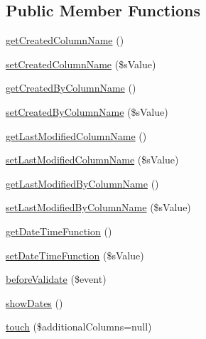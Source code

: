 \subsection*{Public Member Functions}
\begin{DoxyCompactItemize}
\item 
\hyperlink{classCXLTimeStampBehavior_af4acef2afbd2be93afee6dcc132b5634}{getCreatedColumnName} ()
\item 
\hyperlink{classCXLTimeStampBehavior_aefa0bd89eae6e37ce37bca6738781c61}{setCreatedColumnName} (\$sValue)
\item 
\hyperlink{classCXLTimeStampBehavior_a14d422fab23670511b207155a0657557}{getCreatedByColumnName} ()
\item 
\hyperlink{classCXLTimeStampBehavior_af3cf22407098fb8c99099ace3f51fa16}{setCreatedByColumnName} (\$sValue)
\item 
\hyperlink{classCXLTimeStampBehavior_a0905d98612ed716b9368a0e0ac5e5aeb}{getLastModifiedColumnName} ()
\item 
\hyperlink{classCXLTimeStampBehavior_aa43f21092ab8266b9991a5399ec94c44}{setLastModifiedColumnName} (\$sValue)
\item 
\hyperlink{classCXLTimeStampBehavior_a3f2fd113a089ac3e6523c758c5452d64}{getLastModifiedByColumnName} ()
\item 
\hyperlink{classCXLTimeStampBehavior_add7a6532e6d878ba7a4446657a2b3b5d}{setLastModifiedByColumnName} (\$sValue)
\item 
\hyperlink{classCXLTimeStampBehavior_a256dd113f3eddd49910867cd68ec8fc3}{getDateTimeFunction} ()
\item 
\hyperlink{classCXLTimeStampBehavior_aefc5940715628851cc5f6a8c0889b9cd}{setDateTimeFunction} (\$sValue)
\item 
\hyperlink{classCXLTimeStampBehavior_a586e177c0e7073ec63f7ccd6546ff3fd}{beforeValidate} (\$event)
\item 
\hyperlink{classCXLTimeStampBehavior_ae99ec12f90f0458dbd6e2d9dcce34620}{showDates} ()
\item 
\hyperlink{classCXLTimeStampBehavior_aa5ac765fd764508a2e486e01a725b4a1}{touch} (\$additionalColumns=null)
\end{DoxyCompactItemize}
